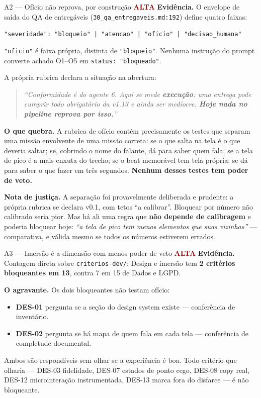 \documentclass[11pt,a4paper]{article}
\newcommand{\sevalta}{\textcolor{DarkRed}{\textbf{ALTA}}}
\begin{document}
\begin{achadobox}{A2 --- Of\'icio n\~ao reprova, por constru\c{c}\~ao \hfill \sevalta}
\textbf{Evid\^encia.} O envelope de sa\'ida do QA de entreg\'aveis
(\texttt{30\_qa\_entregaveis.md:192}) define quatro faixas:

\begin{center}\small
\texttt{"severidade": "bloqueio" | "atencao" | "oficio" | "decisao\_humana"}
\end{center}

\texttt{"oficio"} \'e faixa pr\'opria, distinta de \texttt{"bloqueio"}. Nenhuma instru\c{c}\~ao do
prompt converte achado O1--O5 em \texttt{status: "bloqueado"}.

A pr\'opria rubrica declara a situa\c{c}\~ao na abertura:
\begin{quote}\small
\emph{``Conformidade \'e do agente 6. Aqui se mede \textbf{execu\c{c}\~ao}: uma entrega pode
cumprir todo obrigat\'orio da v1.13 e ainda ser medíocre. \textbf{Hoje nada no pipeline reprova
por isso.}''}
\end{quote}

\textbf{O que quebra.} A rubrica de of\'icio cont\'em precisamente os testes que separam uma
miss\~ao envolvente de uma miss\~ao correta: se o que salta na tela \'e o que deveria saltar; se,
cobrindo o nome do falante, d\'a para saber quem fala; se a tela de pico \'e a mais enxuta do
trecho; se o beat memor\'avel tem tela pr\'opria; se d\'a para saber o que fazer em tr\^es
segundos. \textbf{Nenhum desses testes tem poder de veto.}

\textbf{Nota de justi\c{c}a.} A separa\c{c}\~ao foi provavelmente deliberada e prudente: a
pr\'opria rubrica se declara v0.1, com tetos ``a calibrar''. Bloquear por n\'umero n\~ao calibrado
seria pior. Mas h\'a ali uma regra que \textbf{n\~ao depende de calibragem} e poderia bloquear
hoje: \emph{``a tela de pico tem menos elementos que suas vizinhas''} --- comparativa, e v\'alida
mesmo se todos os n\'umeros estiverem errados.
\end{achadobox}

\begin{achadobox}{A3 --- Imers\~ao \'e a dimens\~ao com menos poder de veto \hfill \sevalta}
\textbf{Evid\^encia.} Contagem direta sobre \texttt{criterios-dev/}: Design e imers\~ao tem
\textbf{2 crit\'erios bloqueantes em 13}, contra 7 em 15 de Dados e LGPD.

\textbf{O agravante.} Os dois bloqueantes n\~ao testam of\'icio:
\begin{itemize}
  \item \textbf{DES-01} pergunta se a se\c{c}\~ao do design system existe --- confer\^encia de
        invent\'ario.
  \item \textbf{DES-02} pergunta se h\'a mapa de quem fala em cada tela --- confer\^encia de
        completude documental.
\end{itemize}

Ambos s\~ao respond\'iveis sem olhar se a experi\^encia \'e boa. Todo crit\'erio que olharia ---
DES-03 fidelidade, DES-07 estados de ponto cego, DES-08 copy real, DES-12 microintera\c{c}\~ao
instrumentada, DES-13 marca fora do disfarce --- \'e n\~ao bloqueante.
\end{achadobox}
\end{document}
